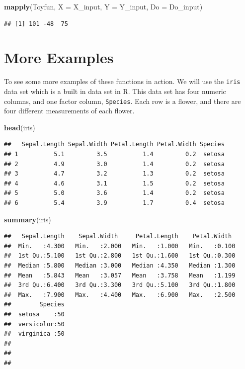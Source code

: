\documentclass[
]{book}
\newenvironment{Shaded}{\begin{snugshade}}{\end{snugshade}}
\newcommand{\DataTypeTok}[1]{\textcolor[rgb]{0.13,0.29,0.53}{#1}}
\newcommand{\KeywordTok}[1]{\textcolor[rgb]{0.13,0.29,0.53}{\textbf{#1}}}
\newcommand{\NormalTok}[1]{#1}
\begin{document}
\begin{Shaded}
\begin{Highlighting}[]
\KeywordTok{mapply}\NormalTok{(Toyfun, }\DataTypeTok{X =}\NormalTok{ X_input, }\DataTypeTok{Y =}\NormalTok{ Y_input, }\DataTypeTok{Do =}\NormalTok{ Do_input)}
\end{Highlighting}
\end{Shaded}

\begin{verbatim}
## [1] 101 -48  75
\end{verbatim}

\hypertarget{more-examples}{%
\section{More Examples}\label{more-examples}}

To see some more examples of these functions in action. We will use the \texttt{iris} data set which is a built in data set in R. This data set has four numeric columns, and one factor column, \texttt{Species}. Each row is a flower, and there are four different measurements of each flower.

\begin{Shaded}
\begin{Highlighting}[]
\KeywordTok{head}\NormalTok{(iris)}
\end{Highlighting}
\end{Shaded}

\begin{verbatim}
##   Sepal.Length Sepal.Width Petal.Length Petal.Width Species
## 1          5.1         3.5          1.4         0.2  setosa
## 2          4.9         3.0          1.4         0.2  setosa
## 3          4.7         3.2          1.3         0.2  setosa
## 4          4.6         3.1          1.5         0.2  setosa
## 5          5.0         3.6          1.4         0.2  setosa
## 6          5.4         3.9          1.7         0.4  setosa
\end{verbatim}

\begin{Shaded}
\begin{Highlighting}[]
\KeywordTok{summary}\NormalTok{(iris)}
\end{Highlighting}
\end{Shaded}

\begin{verbatim}
##   Sepal.Length    Sepal.Width     Petal.Length    Petal.Width   
##  Min.   :4.300   Min.   :2.000   Min.   :1.000   Min.   :0.100  
##  1st Qu.:5.100   1st Qu.:2.800   1st Qu.:1.600   1st Qu.:0.300  
##  Median :5.800   Median :3.000   Median :4.350   Median :1.300  
##  Mean   :5.843   Mean   :3.057   Mean   :3.758   Mean   :1.199  
##  3rd Qu.:6.400   3rd Qu.:3.300   3rd Qu.:5.100   3rd Qu.:1.800  
##  Max.   :7.900   Max.   :4.400   Max.   :6.900   Max.   :2.500  
##        Species  
##  setosa    :50  
##  versicolor:50  
##  virginica :50  
##                 
##                 
## 
\end{verbatim}
\end{document}
